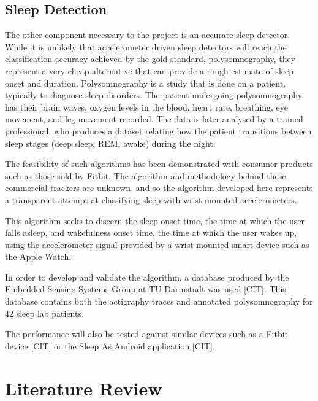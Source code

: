         \section{Sleep Detection}

            The other component necessary to the project is an accurate sleep detector. While it is unlikely that accelerometer driven sleep detectors will reach the classification accuracy achieved by the gold standard, polysomnography, they represent a very cheap alternative that can provide a rough estimate of sleep onset and duration. Polysomnography is a study that is done on a patient, typically to diagnose sleep disorders. The patient undergoing polysomnography has their brain waves, oxygen levels in the blood, heart rate, breathing, eye movement, and leg movement recorded. The data is later analysed by a trained professional, who produces a dataset relating how the patient transitions between sleep stages (deep sleep, REM, awake) during the night.

            The feasibility of such algorithms has been demonstrated with consumer products such as those sold by Fitbit. The algorithm and methodology behind these commercial trackers are unknown, and so the algorithm developed here represents a transparent attempt at classifying sleep with wrist-mounted accelerometers.

            This algorithm seeks to discern the sleep onset time, the time at which the user falls asleep, and wakefulness onset time, the time at which the user wakes up, using the accelerometer signal provided by a wrist mounted smart device such as the Apple Watch.

            In order to develop and validate the algorithm, a database produced by the Embedded Sensing Systems Group at TU Darmstadt was used [CIT]. This database contains both the actigraphy traces and annotated polysomnography for 42 sleep lab patients.

            The performance will also be tested against similar devices such as a Fitbit device [CIT] or the Sleep As Android application [CIT]. 


    \chapter{Literature Review}